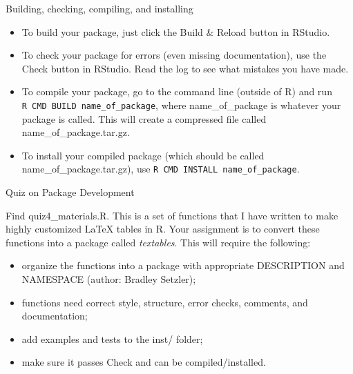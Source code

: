 \documentclass[10pt,ignorenonframetext,]{beamer}
\providecommand{\tightlist}{%
\setlength{\itemsep}{0pt}\setlength{\parskip}{0pt}}
\begin{document}
\begin{frame}[fragile]{Building, checking, compiling, and installing}

\begin{itemize}
\tightlist
\item
  To build your package, just click the Build \& Reload button in
  RStudio.
\item
  To check your package for errors (even missing documentation), use the
  Check button in RStudio. Read the log to see what mistakes you have
  made.
\item
  To compile your package, go to the command line (outside of R) and run
  \texttt{R\ CMD\ BUILD\ name\_of\_package}, where name\_of\_package is
  whatever your package is called. This will create a compressed file
  called name\_of\_package.tar.gz.
\item
  To install your compiled package (which should be called
  name\_of\_package.tar.gz), use
  \texttt{R\ CMD\ INSTALL\ name\_of\_package}.
\end{itemize}

\end{frame}

\begin{frame}{Quiz on Package Development}

Find quiz4\_materials.R. This is a set of functions that I have written
to make highly customized LaTeX tables in R. Your assignment is to
convert these functions into a package called \emph{textables}. This
will require the following:

\begin{itemize}
\tightlist
\item
  organize the functions into a package with appropriate DESCRIPTION and
  NAMESPACE (author: Bradley Setzler);
\item
  functions need correct style, structure, error checks, comments, and
  documentation;
\item
  add examples and tests to the inst/ folder;
\item
  make sure it passes Check and can be compiled/installed.
\end{itemize}

\end{frame}
\end{document}
